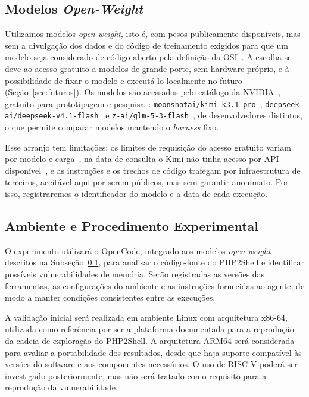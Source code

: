 \documentclass[12pt]{article}
\begin{document}
\subsection{Modelos \textit{Open-Weight}}
\label{sec:modelos}

Utilizamos modelos \textit{open-weight}, isto é, com pesos publicamente disponíveis, mas sem a divulgação dos dados e do código de treinamento exigidos para que um modelo seja considerado de código aberto pela definição da OSI~\cite{osi2024osaid}. A escolha se deve ao acesso gratuito a modelos de grande porte, sem hardware próprio, e à possibilidade de fixar o modelo e executá-lo localmente no futuro (Seção~\ref{sec:futuros}). Os modelos são acessados pelo catálogo da NVIDIA~\cite{nvidia2026build}, gratuito para prototipagem e pesquisa~\cite{nvidia2026nimfaq}: \texttt{moonshotai/kimi-k3.1-pro}~\cite{nvidia2026kimi}, \texttt{deepseek-ai/deepseek-v4.1-flash}~\cite{nvidia2026deepseek} e \texttt{z-ai/glm-5-3-flash}~\cite{nvidia2026glm}, de desenvolvedores distintos, o que permite comparar modelos mantendo o \textit{harness} fixo.

Esse arranjo tem limitações: os limites de requisição do acesso gratuito variam por modelo e carga~\cite{nvidia2026nimfaq}, na data de consulta o Kimi não tinha acesso por API disponível~\cite{nvidia2026kimi}, e as instruções e os trechos de código trafegam por infraestrutura de terceiros, aceitável aqui por serem públicos, mas sem garantir anonimato. Por isso, registraremos o identificador do modelo e a data de cada execução.

\subsection{Ambiente e Procedimento Experimental}

O experimento utilizará o OpenCode, integrado aos modelos
\textit{open-weight} descritos na Subseção~\ref{sec:modelos}, para analisar o código-fonte do PHP2Shell e identificar
possíveis vulnerabilidades de memória. Serão registradas as versões
das ferramentas, as configurações do ambiente e as instruções
fornecidas ao agente, de modo a manter condições consistentes
entre as execuções.

A validação inicial será realizada em ambiente Linux com arquitetura x86-64, utilizada como referência por ser a plataforma documentada para a reprodução da cadeia de exploração do PHP2Shell. A arquitetura ARM64 será considerada para avaliar a portabilidade dos resultados, desde que haja suporte compatível às versões do software e aos componentes necessários. O uso de RISC-V poderá ser investigado posteriormente, mas não será tratado como requisito para a reprodução da vulnerabilidade.
\end{document}
